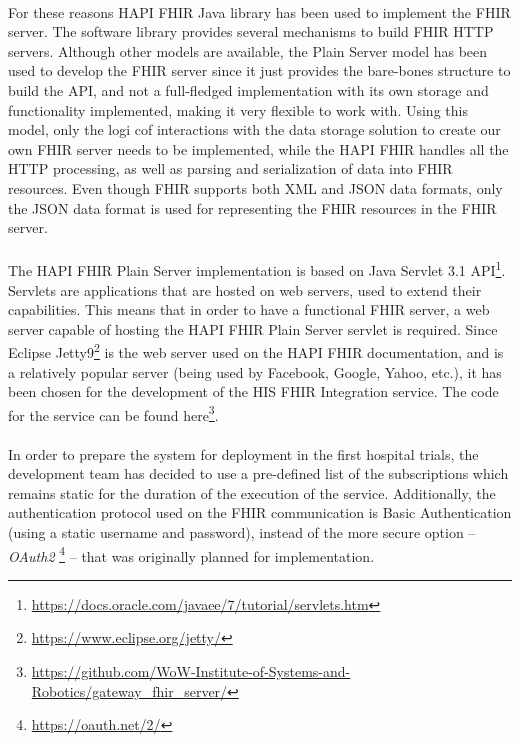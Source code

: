 \paragraph{} For these reasons HAPI FHIR Java library has been used to implement the \acs{FHIR} server. The software library provides several mechanisms to build \acs{FHIR} \acs{HTTP} servers. Although other models are available, the Plain Server model \cite{hapifhir} has been used to develop the \acs{FHIR} server since it just provides the bare-bones structure to build the \acs{API}, and not a full-fledged implementation with its own storage and functionality implemented, making it very flexible to work with. Using this model, only the logi cof interactions with the data storage solution to create our own \acs{FHIR} server needs to be implemented, while the HAPI FHIR handles all the \acs{HTTP} processing, as well as parsing and serialization of data into \acs{FHIR} resources. Even though \acs{FHIR} supports both \acf{XML} and \acf{JSON} data formats, only the \acs{JSON} data format is used for representing the \acs{FHIR} resources in the \acs{FHIR} server.

\paragraph{} The HAPI FHIR Plain Server implementation is based on Java Servlet 3.1 \acs{API}\footnote{\url{https://docs.oracle.com/javaee/7/tutorial/servlets.htm}}. Servlets are applications that are hosted on web servers, used to extend their capabilities. This means that in order to have a functional \acs{FHIR} server, a web server capable of hosting the HAPI FHIR Plain Server servlet is required. Since Eclipse Jetty9\footnote{\url{https://www.eclipse.org/jetty/}} is the web server used on the HAPI FHIR documentation, and is a relatively popular server (being used by Facebook, Google, Yahoo, etc.), it has been chosen for the development of the \acs{HIS} \acs{FHIR} Integration service. The code for the service can be found here\footnote{\url{https://github.com/WoW-Institute-of-Systems-and-Robotics/gateway_fhir_server/}}.

\paragraph{} In order to prepare the system for deployment in the first hospital trials, the development team has decided to use a pre-defined list of the subscriptions which remains static for the duration of the execution of the service. Additionally, the authentication protocol used on the \acs{FHIR} communication is Basic Authentication (using a static username and password), instead of the more secure option -- \textit{OAuth2} \footnote{\url{https://oauth.net/2/}} -- that was originally planned for implementation.

